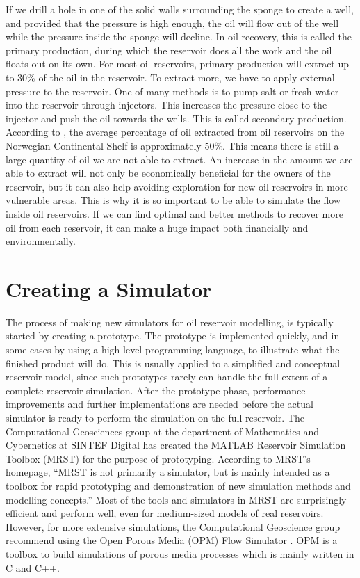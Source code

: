 If we drill a hole in one of the solid walls surrounding the sponge to create a well, and provided that the pressure is high enough, the oil will flow out of the well while the pressure inside the sponge will decline. In oil recovery, this is called the primary production, during which the reservoir does all the work and the oil floats out on its own. For most oil reservoirs, primary production will extract up to 30\% of the oil in the reservoir. To extract more, we have to apply external pressure to the reservoir. One of many methods is to pump salt or fresh water into the reservoir through injectors. This increases the pressure close to the injector and push the oil towards the wells. This is called secondary production. According to \citet{lieMrstUrl}, the average percentage of oil extracted from oil reservoirs on the Norwegian Continental Shelf is approximately 50\%. This means there is still a large quantity of oil we are not able to extract. An increase in the amount we are able to extract will not only be economically beneficial for the owners of the reservoir, but it can also help avoiding exploration for new oil reservoirs in more vulnerable areas. This is why it is so important to be able to simulate the flow inside oil reservoirs. If we can find optimal and better methods to recover more oil from each reservoir, it can make a huge impact both financially and environmentally.

\section{Creating a Simulator}
The process of making new simulators for oil reservoir modelling, is typically started by creating a prototype. The prototype is implemented quickly, and in some cases by using a high-level programming language, to illustrate what the finished product will do. This is usually applied to a simplified and conceptual reservoir model, since such prototypes rarely can handle the full extent of a complete reservoir simulation. After the prototype phase, performance improvements and further implementations are needed before the actual simulator is ready to perform the simulation on the full reservoir. The Computational Geosciences group at the department of Mathematics and Cybernetics at SINTEF Digital has created the MATLAB Reservoir Simulation Toolbox (MRST) \emph{\citep{mrstHomepage}} for the  purpose of prototyping. According to MRST's homepage, \enquote{MRST is not primarily a simulator, but is mainly intended as a toolbox for rapid prototyping and demonstration of new simulation methods and modelling concepts.} Most of the tools and simulators in MRST are surprisingly efficient and perform well, even for medium-sized models of real reservoirs. However, for more extensive simulations, the Computational Geoscience group recommend using the Open Porous Media (OPM) Flow Simulator \emph{\citep{opm}}. OPM is a toolbox to build simulations of porous media processes which is mainly written in C and C++. 

